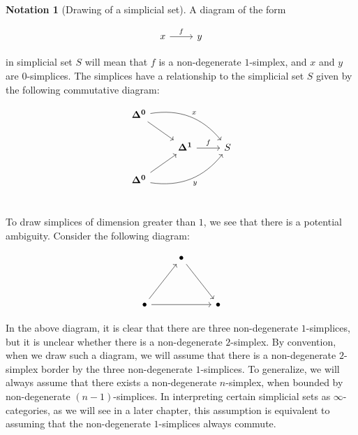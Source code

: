 \documentclass[10pt]{amsart}
\newcommand{\8}{\ensuremath{\infty}}
\newcommand{\0}{\ensuremath{\overset{\rightarrow}{0}}}
\newcommand{\1}{\ensuremath{\mathbf{1}}}
\newcommand{\Simplex}[1]{\ensuremath{\boldsymbol{\Delta^{#1}}}}
\theoremstyle{definition}
\newtheorem{notation}[definition]{Notation}
\numberwithin{definition}{subsection}
\numberwithin{definition}{section}
\begin{document}
\begin{notation}[Drawing of a simplicial set\label{not:drawsset}]
  A diagram of the form

  \begin{equation*}
    \begin{tikzcd}
      x \arrow[r, "f"] & y
    \end{tikzcd}
  \end{equation*}

  in simplicial set $S$ will mean that $f$ is a non-degenerate $1$-simplex, and $x$ and $y$ are $0$-simplices. The simplices have a relationship to the simplicial set $S$ given by the following commutative diagram:

  \begin{equation*}
    \begin{tikzcd}
      \Simplex{0} \arrow[dr] \arrow[drr, "x", bend left] & & \\
      & \Simplex{1} \arrow[r, "f"] & S \\
      \Simplex{0} \arrow[ur] \arrow[urr, "y"', bend right] & & \\
    \end{tikzcd}
  \end{equation*}

  To draw simplices of dimension greater than $1$, we see that there is a potential ambiguity. Consider the following diagram:

  \begin{equation*}
    \begin{tikzcd}
      & \bullet \arrow[ddr] & \\
      \\
      \bullet \arrow[uur] \arrow[rr] & & \bullet
    \end{tikzcd}
  \end{equation*}

  In the above diagram, it is clear that there are three non-degenerate $1$-simplices, but it is unclear whether there is a non-degenerate $2$-simplex. By convention, when we draw such a diagram, we will assume that there is a non-degenerate $2$-simplex border by the three non-degenerate $1$-simplices. To generalize, we will always assume that there exists a non-degenerate $n$-simplex, when bounded by non-degenerate $(n - 1)$-simplices. In interpreting certain simplicial sets as \8-categories, as we will see in a later chapter, this assumption is equivalent to assuming that the non-degenerate $1$-simplices always commute.
\end{notation}
\end{document}
